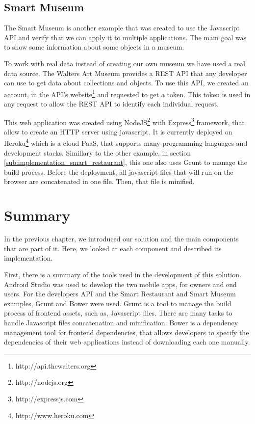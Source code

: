 \subsection{Smart Museum}
\label{sub:implementation_smart_museum}
The Smart Museum is another example that was created to use the Javascript \gls{API} and verify that we can apply it to multiple applications.
The main goal was to show some information about some objects in a museum.

To work with real data instead of creating our own museum we have used a real data source.
The Walters Art Museum provides a \gls{REST} \gls{API} that any developer can use to get data about collections and objects.
To use this \gls{API}, we created an account, in the \gls{API}'s website\footnote{http://api.thewalters.org} and requested to get a token. This token is used in any request to allow the \gls{REST} \gls{API} to identify each individual request.

This web application was created using NodeJS\footnote{http://nodejs.org} with Express\footnote{http://expressjs.com} framework, that allow to create an \gls{HTTP} server using javascript.
It is currently deployed on Heroku\footnote{http://www.heroku.com} which is a cloud \gls{PaaS}, that supports many programming languages and development stacks.
Simillary to the other example, in section \ref{sub:implementation_smart_restaurant}, this one also uses Grunt to manage the build process. Before the deployment, all javascript files that will run on the browser are concatenated in one file. Then, that file is minified.

\section{Summary}
\label{sec:implementation_summary}
In the previous chapter, we introduced our solution and the main components that are part of it.
Here, we looked at each component and described its implementation.

First, there is a summary of the tools used in the development of this solution.
Android Studio was used to develop the two mobile apps, for owners and end users.
For the developers \gls{API} and the Smart Restaurant and Smart Museum examples, Grunt and Bower were used.
Grunt is a tool to manage the build process of frontend assets, such as, Javascript files.
There are many tasks to handle Javascript files concatenation and minification.
Bower is a dependency management tool for frontend dependencies, that allows developers to specify the dependencies of their web applications instead of downloading each one manually.

